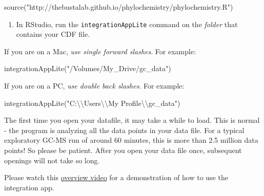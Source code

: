 \documentclass[
]{krantz}
\newenvironment{Shaded}{\begin{snugshade}}{\end{snugshade}}
\newcommand{\FunctionTok}[1]{\textcolor[rgb]{0.00,0.00,0.00}{#1}}
\newcommand{\NormalTok}[1]{#1}
\newcommand{\SpecialCharTok}[1]{\textcolor[rgb]{0.00,0.00,0.00}{#1}}
\newcommand{\StringTok}[1]{\textcolor[rgb]{0.31,0.60,0.02}{#1}}
\providecommand{\tightlist}{%
  \setlength{\itemsep}{0pt}\setlength{\parskip}{0pt}}
\begin{document}
\begin{Shaded}
\begin{Highlighting}[]
\FunctionTok{source}\NormalTok{(}\StringTok{"http://thebustalab.github.io/phylochemistry/phylochemistry.R"}\NormalTok{)}
\end{Highlighting}
\end{Shaded}

\hfill\break

\begin{enumerate}
\def\labelenumi{\arabic{enumi}.}
\setcounter{enumi}{2}
\tightlist
\item
  In RStudio, run the \texttt{integrationAppLite} command on the \emph{folder} that contains your CDF file.\\
\end{enumerate}

If you are on a Mac, \emph{use single forward slashes}. For example:

\begin{Shaded}
\begin{Highlighting}[]
\FunctionTok{integrationAppLite}\NormalTok{(}\StringTok{"/Volumes/My\_Drive/gc\_data"}\NormalTok{)}
\end{Highlighting}
\end{Shaded}

\hfill\break

If you are on a PC, \emph{use double back slashes}. For example:

\begin{Shaded}
\begin{Highlighting}[]
\FunctionTok{integrationAppLite}\NormalTok{(}\StringTok{"C:}\SpecialCharTok{\textbackslash{}\textbackslash{}}\StringTok{Users}\SpecialCharTok{\textbackslash{}\textbackslash{}}\StringTok{My Profile}\SpecialCharTok{\textbackslash{}\textbackslash{}}\StringTok{gc\_data"}\NormalTok{)}
\end{Highlighting}
\end{Shaded}

\hfill\break

The first time you open your datafile, it may take a while to load. This is normal - the program is analyzing all the data points in your data file. For a typical exploratory GC-MS run of around 60 minutes, this is more than 2.5 million data points! So please be patient. After you open your data file once, subsequent openings will not take so long.

Please watch this \href{https://drive.google.com/file/d/1Jv-EEwaLIxpQJSVZGD1NFkfZGOUaayKo/view?usp=sharing}{overview video} for a demonstration of how to use the integration app.
\end{document}
